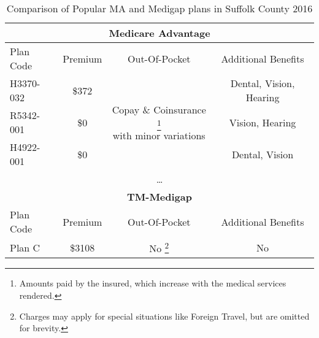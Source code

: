 \begin{table}[ht]
    \centering
    \caption{Comparison of Popular MA and Medigap plans in Suffolk County 2016}
    \begin{tabular}{|l|c|c|c|}
    \hline
    \multicolumn{4}{|c|}{\textbf{Medicare Advantage}} \\
    \hline
    Plan Code & Premium & Out-Of-Pocket & Additional Benefits \\
    \hline
    H3370-032 & \$372  & \multirow{3}{*}{\parbox{4cm}{Copay \& Coinsurance \footnote{Amounts paid by the insured, which increase with the medical services rendered.} \\ with minor variations}} & Dental, Vision, Hearing   \\
    \cline{1-2}\cline{4-4}
    R5342-001 & \$0 & & Vision, Hearing           \\
    \cline{1-2}\cline{4-4}
    H4922-001 & \$0 & & Dental, Vision           \\
    \multicolumn{4}{|c|}{\ldots} \\
    \hline
    \multicolumn{4}{|c|}{\textbf{TM-Medigap}} \\
    \hline
    Plan Code & Premium & Out-Of-Pocket & Additional Benefits \\
    \hline
    Plan C & \$3108  & No \footnote{Charges may apply for special situations like Foreign Travel, but are omitted for brevity.} & No \\
    \hline
    \end{tabular}
\end{table}
    
    
    